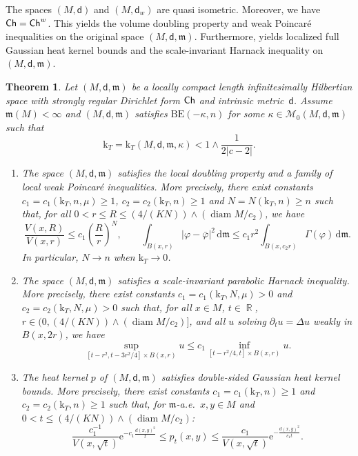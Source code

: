 \documentclass[10pt]{article}
\newcommand{\m}{\mathfrak{m}}
\newcommand{\M}{{\mathit{M}}}
\DeclareMathOperator{\diam}{diam}
\renewcommand{\d}{\,\mathrm{d}}
\newcommand{\e}{\mathrm{e}}
\renewcommand{\k}{\mathrm{k}}
\newcommand{\dist}{\mathsf{d}}
\newcommand{\Ch}{{\sf Ch}}
\DeclareMathOperator{\RR}{\mathbb{R}}
\newcommand{\BE}{{\mathrm{BE}}}
\theoremstyle{plain}
\newtheorem{theorem}{Theorem}[section]
\theoremstyle{definition}
\begin{document}
The spaces $(\M,\dist)$ and $(\M,\dist_w)$ are quasi isometric. Moreover, we have $\Ch=\Ch^w$.  This yields the volume doubling property and weak Poincar\'e inequalities on the original space $(\M,\dist,\m)$. Furthermore, \cite{Sturm95_II,Sturm-96} yields localized full Gaussian heat kernel bounds and the scale-invariant Harnack inequality on $(\M,\dist,\m)$.


\begin{theorem}\label{thm:main1}
    Let $(\M,\dist,\m)$ be a locally compact length infinitesimally Hilbertian space with strongly regular Dirichlet form $\Ch$ and intrinsic metric~$\dist$. Assume  $\m(\M)<\infty$ and  $(\M,\dist,\m)$ satisfies $\BE(-\kappa,n)$ for some $\kappa \in \mathcal{M}_0(M,\dist,\m)$ such that
\[\k_T= \k_T(M,\dist,\m,\kappa)<1\wedge \frac{1}{2|c-2|}.\]
  \begin{enumerate}
        \item
    The space $(\M,\dist,\m)$ satisfies the local doubling property and a family of local weak Poincar\'e inequalities. More precisely, there exist constants $c_1=c_1(\k_T,n,\mu)\geq 1$, $c_2=c_2(\k_T,n)\geq 1$ and $N=N(\k_T,n)\geq n$ such that, for all $0<r\leq R\leq (4/(KN))\wedge (\diam\M/c_2)$, we have
    \[
    \frac{V(x,R)}{V(x,r)}\leq c_1\left(\frac{R}{r}\right)^{N},\qquad \int_{B(x,r)}|\varphi-\bar\varphi|^2\d\m\leq c_1r^2\int_{B(x,c_2 r)}\Gamma(\varphi)\d\m.
    \]
    In particular, $N\to n$ when $\k_T\to 0$.
     \item The space $(\M,\dist,\m)$ satisfies a scale-invariant parabolic Harnack inequality. More precisely, there exist constants $c_1=c_1(\k_T,N,\mu)>0$ and $c_2=c_2(\k_T,N,\mu)>0$ such that, for all $x\in M$, $t\in\RR$, $r\in(0,(4/(KN))\wedge (\diam\M/c_2)]$, and all $u$ solving $\partial_tu=\Delta u $ weakly in $B(x,2r)$, we have 
    \[
    \sup_{[t-r^2,t-3r^2/4]\times B(x,r)} u \leq c_1 \inf_{[t-r^2/4,t]\times B(x,r)} u.
    \]
    \item The heat kernel $p$ of $(\M,\dist,\m)$ satisfies double-sided Gaussian heat kernel bounds. More precisely, there exist constants $c_1=c_1(\k_T,n)\ge 1$ and $c_2=c_2(\k_T,n)\geq 1$ such that, for $\m$-a.e.~$x,y\in \M$ and $0<t\leq (4/(KN))\wedge (\diam\M/c_2)$:
    \[
    \frac{c_1^{-1}}{V(x,\sqrt{t})}\e^{-c_1\frac{d(x,y)^2}{t}
    }
    \leq p_t(x,y)
    \leq 
    \frac{c_1}{V(x,\sqrt{t})}\e^{-\frac{d(x,y)^2}{c_1t}
    }.
    \]
    \end{enumerate}
\end{theorem}
\end{document}
